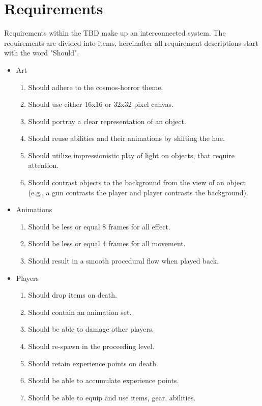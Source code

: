 \documentclass[a4paper,11pt]{article}
\begin{document}
\section{Requirements}
Requirements within the TBD make up an interconnected system. The requirements are divided into items, hereinafter all requirement descriptions start with the word "Should".
\begin{itemize}
    \item Art
    \begin{enumerate}
        \item Should adhere to the cosmos-horror theme.
        \item Should use either 16x16 or 32x32 pixel canvas.
        \item Should portray a clear representation of an object.
        \item Should reuse abilities and their animations by shifting the hue.
        \item Should utilize impressionistic play of light on objects, that require attention.
        \item Should contrast objects to the background from the view of an object (e.g., a gun contrasts the player and player contrasts the background).
    \end{enumerate}
    \item Animations
    \begin{enumerate}
        \item Should be less or equal 8 frames for all effect.
        \item Should be less or equal 4 frames for all movement.
        \item Should result in a smooth procedural flow when played back.
    \end{enumerate}
    \item Players
    \begin{enumerate}
        \item Should drop items on death.
        \item Should contain an animation set.
        \item Should be able to damage other players.
        \item Should re-spawn in the proceeding level.
        \item Should retain experience points on death.
        \item Should be able to accumulate experience points.
        \item Should be able to equip and use items, gear, abilities.

\end{enumerate}
\end{itemize}
\end{document}
